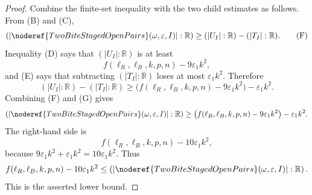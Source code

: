 \begin{proof}
Combine the finite-set inequality with the two child estimates as follows.
From (B) and (C),
\[
\left(\left|\noderef{TwoBiteStagedOpenPairs}(\omega,\varepsilon,I)\right|:
\mathbb R\right)
\ge (|U_I|:\mathbb R)-(|T_I|:\mathbb R).
\tag{F}
\]
Inequality (D) says that \((|U_I|:\mathbb R)\) is at least
\[
f(\ell_R,\ell_B,k,p,n)-9\varepsilon_1k^2,
\]
and (E) says that subtracting \((|T_I|:\mathbb R)\) loses at most
\(\varepsilon_1k^2\).  Therefore
\[
(|U_I|:\mathbb R)-(|T_I|:\mathbb R)
\ge \bigl(f(\ell_R,\ell_B,k,p,n)-9\varepsilon_1k^2\bigr)
    -\varepsilon_1k^2.
\tag{G}
\]
Combining (F) and (G) gives
\[
\left(\left|\noderef{TwoBiteStagedOpenPairs}(\omega,\varepsilon,I)\right|:
\mathbb R\right)
\ge
\bigl(f(\ell_R,\ell_B,k,p,n)-9\varepsilon_1k^2\bigr)-\varepsilon_1k^2.
\]
The right-hand side is
\[
f(\ell_R,\ell_B,k,p,n)-10\varepsilon_1k^2,
\]
because \(9\varepsilon_1k^2+\varepsilon_1k^2=10\varepsilon_1k^2\).  Thus
\[
f(\ell_R,\ell_B,k,p,n)-10\varepsilon_1k^2
\le
\left(\left|\noderef{TwoBiteStagedOpenPairs}(\omega,\varepsilon,I)\right|:
\mathbb R\right).
\]
This is the asserted lower bound.
\end{proof}
